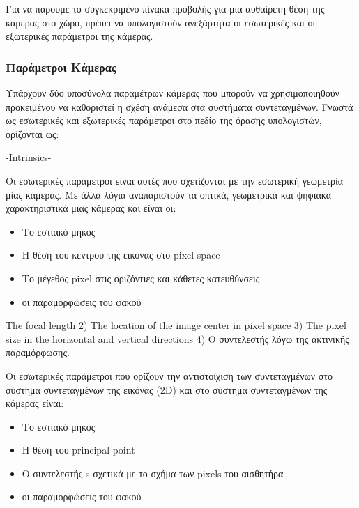 Για να πάρουμε το συγκεκριμένο πίνακα προβολής για μία αυθαίρετη θέση της κάμερας στο χώρο, πρέπει να υπολογιστούν ανεξάρτητα οι εσωτερικές και οι εξωτερικές παράμετροι της κάμερας. 




\subsubsection{Παράμετροι Κάμερας}

Υπάρχουν δύο υποσύνολα παραμέτρων κάμερας που μπορούν να χρησιμοποιηθούν προκειμένου να καθοριστεί η σχέση ανάμεσα στα συστήματα συντεταγμένων.
Γνωστά ως εσωτερικές και εξωτερικές παράμετροι στο πεδίο της όρασης υπολογιστών, ορίζονται ως:



-Intrinsics-


Οι εσωτερικές παράμετροι είναι αυτές που σχετίζονται με την εσωτερική γεωμετρία μίας κάμερας. Με άλλα λόγια αναπαριστούν τα οπτικά, γεωμετρικά και ψηφιακα χαρακτηριστικά μιας κάμερας και είναι οι:

\begin{itemize}
\item Το εστιακό μήκος
\item Η θέση του κέντρου της εικόνας στο pixel space
\item Το μέγεθος pixel στις οριζόντιες και κάθετες κατευθύνσεις
\item οι παραμορφώσεις του φακού
\end{itemize}

The focal length
2) The location of the image center in pixel space
3) The pixel size in the horizontal and vertical directions
4) Ο συντελεστής λόγω της ακτινικής παραμόρφωσης.




Οι εσωτερικές παράμετροι που ορίζουν την αντιστοίχιση των συντεταγμένων στο σύστημα συντεταγμένων της εικόνας (2D) και στο σύστημα συντεταγμένων της κάμερας είναι:

\begin{itemize}
\item Το εστιακό μήκος
\item Η θέση του principal point
\item Ο συντελεστής s σχετικά με το σχήμα των pixels του αισθητήρα
\item οι παραμορφώσεις του φακού
\end{itemize}






